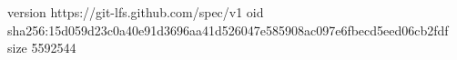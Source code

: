version https://git-lfs.github.com/spec/v1
oid sha256:15d059d23c0a40e91d3696aa41d526047e585908ac097e6fbecd5eed06cb2fdf
size 5592544

